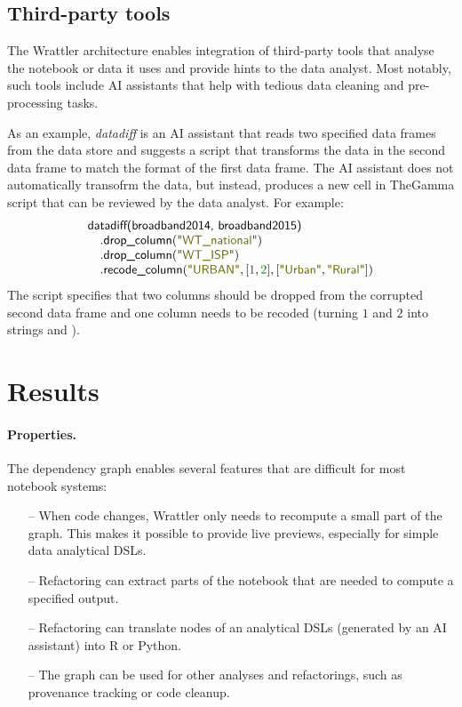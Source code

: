 \documentclass[sigplan]{acmart}\settopmatter{printfolios=true,printccs=false,printacmref=false}
\begin{document}
\subsection{Third-party tools}
\label{sec:comp-ai}

The Wrattler architecture enables integration of third-party tools that analyse the notebook
or data it uses and provide hints to the data analyst. Most notably, such tools include AI 
assistants that help with tedious data cleaning and pre-processing tasks. 

As an example, \emph{datadiff} is an AI assistant that reads two specified data frames from the
data store and suggests a script that transforms the data in the second data frame to match the
format of the first data frame. The AI assistant does not automatically transofrm the data, but
instead, produces a new cell in TheGamma script that can be reviewed by the data analyst. 
For example:
%
\begin{equation*}
\begin{array}{l}
\ident{datadiff(broadband2014, broadband2015)}\\
\quad.\ident{drop\_column}(\str{WT\_national})\\
\quad.\ident{drop\_column}(\str{WT\_ISP})\\
\quad.\ident{recode\_column}(\str{URBAN}, [\num{1}, \num{2}], [\str{Urban},\str{Rural}])
\end{array}  
\end{equation*}
%
The script specifies that two columns should be dropped from the corrupted second data frame and
one column needs to be recoded (turning $\num{1}$ and $\num{2}$ into strings
 and ). 

\section{Results}
\label{sec:results}


\paragraph{Properties.}
The dependency graph enables several features that are difficult for most notebook systems:
%
\begin{itemize}
\item[--] When code changes, Wrattler only needs to recompute a small part of the graph.
  This makes it possible to provide live previews, especially for simple data analytical DSLs.
\item[--] Refactoring can extract parts of the notebook that
  are needed to compute a specified output.
\vspace{0.25em}
\item[--] Refactoring can translate nodes of an analytical DSLs (generated by an AI assistant) into R or Python.
\vspace{0.25em}
\item[--] The graph can be used for other analyses and refactorings, such as provenance tracking
  or code cleanup.
\end{itemize}
\end{document}
